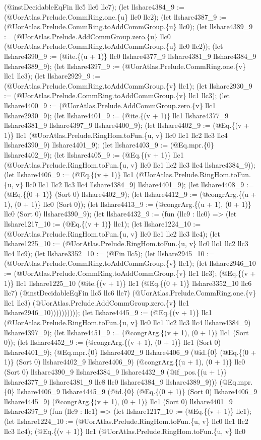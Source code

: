 \documentclass[11pt]{article}
\begin{document}
(@instDecidableEqFin llc5 llc6 llc7); (let llshare4384\_9 := (@UorAtlas.Prelude.CommRing.one.\{u\} llc0 llc2); (let llshare4387\_9 := (@UorAtlas.Prelude.CommRing.toAddCommGroup.\{u\} llc0); (let llshare4389\_9 := (@UorAtlas.Prelude.AddCommGroup.zero.\{u\} llc0 (@UorAtlas.Prelude.CommRing.toAddCommGroup.\{u\} llc0 llc2)); (let llshare4390\_9 := (@ite.\{(u + 1)\} llc0 llshare4377\_9 llshare4381\_9 llshare4384\_9 llshare4389\_9); (let llshare4397\_9 := (@UorAtlas.Prelude.CommRing.one.\{v\} llc1 llc3); (let llshare2929\_9 := (@UorAtlas.Prelude.CommRing.toAddCommGroup.\{v\} llc1); (let llshare2930\_9 := (@UorAtlas.Prelude.CommRing.toAddCommGroup.\{v\} llc1 llc3); (let llshare4400\_9 := (@UorAtlas.Prelude.AddCommGroup.zero.\{v\} llc1 llshare2930\_9); (let llshare4401\_9 := (@ite.\{(v + 1)\} llc1 llshare4377\_9 llshare4381\_9 llshare4397\_9 llshare4400\_9); (let llshare4402\_9 := (@Eq.\{(v + 1)\} llc1 (@UorAtlas.Prelude.RingHom.toFun.\{u, v\} llc0 llc1 llc2 llc3 llc4 llshare4390\_9) llshare4401\_9); (let llshare4403\_9 := (@Eq.mpr.\{0\} llshare4402\_9); (let llshare4405\_9 := (@Eq.\{(v + 1)\} llc1 (@UorAtlas.Prelude.RingHom.toFun.\{u, v\} llc0 llc1 llc2 llc3 llc4 llshare4384\_9)); (let llshare4406\_9 := (@Eq.\{(v + 1)\} llc1 (@UorAtlas.Prelude.RingHom.toFun.\{u, v\} llc0 llc1 llc2 llc3 llc4 llshare4384\_9) llshare4401\_9); (let llshare4408\_9 := (@Eq.\{(0 + 1)\} (Sort 0) llshare4402\_9); (let llshare4412\_9 := (@congrArg.\{(u + 1), (0 + 1)\} llc0 (Sort 0)); (let llshare4413\_9 := (@congrArg.\{(u + 1), (0 + 1)\} llc0 (Sort 0) llshare4390\_9); (let llshare4432\_9 := (fun (llc9 : llc0) => (let llshare1217\_10 := (@Eq.\{(v + 1)\} llc1); (let llshare1224\_10 := (@UorAtlas.Prelude.RingHom.toFun.\{u, v\} llc0 llc1 llc2 llc3 llc4); (let llshare1225\_10 := (@UorAtlas.Prelude.RingHom.toFun.\{u, v\} llc0 llc1 llc2 llc3 llc4 llc9); (let llshare3352\_10 := (@Fin llc5); (let llshare2945\_10 := (@UorAtlas.Prelude.CommRing.toAddCommGroup.\{v\} llc1); (let llshare2946\_10 := (@UorAtlas.Prelude.CommRing.toAddCommGroup.\{v\} llc1 llc3); (@Eq.\{(v + 1)\} llc1 llshare1225\_10 (@ite.\{(v + 1)\} llc1 (@Eq.\{(0 + 1)\} llshare3352\_10 llc6 llc7) (@instDecidableEqFin llc5 llc6 llc7) (@UorAtlas.Prelude.CommRing.one.\{v\} llc1 llc3) (@UorAtlas.Prelude.AddCommGroup.zero.\{v\} llc1 llshare2946\_10)))))))))); (let llshare4445\_9 := (@Eq.\{(v + 1)\} llc1 (@UorAtlas.Prelude.RingHom.toFun.\{u, v\} llc0 llc1 llc2 llc3 llc4 llshare4384\_9) llshare4397\_9); (let llshare4451\_9 := (@congrArg.\{(v + 1), (0 + 1)\} llc1 (Sort 0)); (let llshare4452\_9 := (@congrArg.\{(v + 1), (0 + 1)\} llc1 (Sort 0) llshare4401\_9); (@Eq.mpr.\{0\} llshare4402\_9 llshare4406\_9 (@id.\{0\} (@Eq.\{(0 + 1)\} (Sort 0) llshare4402\_9 llshare4406\_9) (@congrArg.\{(u + 1), (0 + 1)\} llc0 (Sort 0) llshare4390\_9 llshare4384\_9 llshare4432\_9 (@if\_pos.\{(u + 1)\} llshare4377\_9 llshare4381\_9 llc8 llc0 llshare4384\_9 llshare4389\_9))) (@Eq.mpr.\{0\} llshare4406\_9 llshare4445\_9 (@id.\{0\} (@Eq.\{(0 + 1)\} (Sort 0) llshare4406\_9 llshare4445\_9) (@congrArg.\{(v + 1), (0 + 1)\} llc1 (Sort 0) llshare4401\_9 llshare4397\_9 (fun (llc9 : llc1) => (let llshare1217\_10 := (@Eq.\{(v + 1)\} llc1); (let llshare1224\_10 := (@UorAtlas.Prelude.RingHom.toFun.\{u, v\} llc0 llc1 llc2 llc3 llc4); (@Eq.\{(v + 1)\} llc1 (@UorAtlas.Prelude.RingHom.toFun.\{u, v\} llc0 
\end{document}
